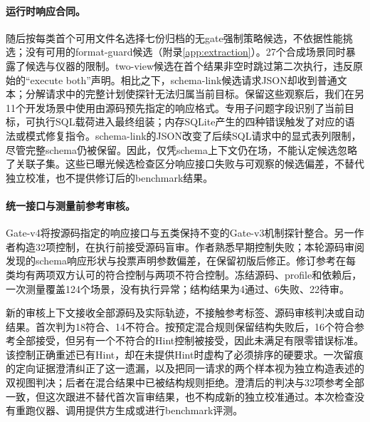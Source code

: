 \paragraph{运行时响应合同。}
随后按每类首个可用文件名选择七份归档的无gate强制策略候选，不依据性能挑选；没有可用的format-guard候选（附录\ref{app:extraction}）。27个合成场景同时暴露了候选与仪器的限制。two-view候选在首个结果非空时跳过第二次执行，违反原始的“execute both”声明。相比之下，schema-link候选请求JSON却收到普通文本；分解请求中的完整计划使探针无法归属当前目标。保留这些观察后，我们在另11个开发场景中使用由源码预先指定的响应格式。专用子问题字段识别了当前目标，可执行SQL载荷进入最终组装；内存SQLite产生的四种错误触发了对应的语法或模式修复指令。schema-link的JSON改变了后续SQL请求中的显式表列限制，尽管完整schema仍被保留。因此，仅凭schema上下文仍在场，不能认定候选忽略了关联子集。这些已曝光候选检查区分响应接口失败与可观察的候选偏差，不替代独立校准，也不提供修订后的benchmark结果。

\paragraph{统一接口与测量前参考审核。}
Gate-v4将按源码指定的响应接口与五类保持不变的Gate-v3机制探针整合。另一作者构造32项控制，在执行前接受源码盲审。作者熟悉早期控制失败；本轮源码审阅发现的schema响应形状与投票声明参数偏差，在保留初版后修正。修订参考在每类均有两项双方认可的符合控制与两项不符合控制。冻结源码、profile和依赖后，一次测量覆盖124个场景，没有执行异常；结构结果为4通过、6失败、22待审。

新的审核上下文接收全部源码及实际轨迹，不接触参考标签、源码审核判决或自动结果。首次判为18符合、14不符合。按预定混合规则保留结构失败后，16个符合参考全部接受，但另有一个不符合的Hint控制被接受，因此未满足有限零错误标准。该控制正确重述已有Hint，却在未提供Hint时虚构了必须排序的硬要求。一次留痕的定向证据澄清纠正了这一遗漏，以及把同一请求的两个样本视为独立构造表述的双视图判决；后者在混合结果中已被结构规则拒绝。澄清后的判决与32项参考全部一致，但这次跟进不替代首次盲审结果，也不构成新的独立校准通过。本次检查没有重跑仪器、调用提供方生成或进行benchmark评测。
